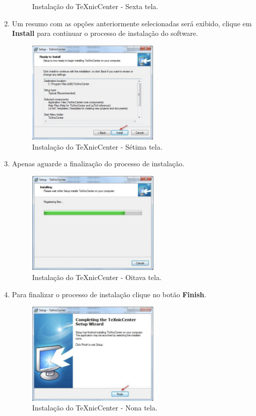 \begin{enumerate}
\begin{figure}[H]
  \caption{Instalação do TeXnicCenter - Sexta tela.}
\end{figure}
\item Um resumo com as opções anteriormente selecionadas será exibido, clique em \textbf{Install} para continuar o processo de instalação do software.
\begin{figure}[H]
  \centering
  \includegraphics[width=0.6\textwidth]{./fig/texniccenter09}
  \caption{Instalação do TeXnicCenter - Sétima tela.}
\end{figure}
\item Apenas aguarde a finalização do processo de instalação.
\begin{figure}[H]
  \centering
  \includegraphics[width=0.6\textwidth]{./fig/texniccenter10}
  \caption{Instalação do TeXnicCenter - Oitava tela.}
\end{figure}
\item Para finalizar o processo de instalação clique no botão \textbf{Finish}.
\begin{figure}[H]
  \centering
  \includegraphics[width=0.6\textwidth]{./fig/texniccenter11}
  \caption{Instalação do TeXnicCenter - Nona tela.}
\end{figure}
\end{enumerate}

